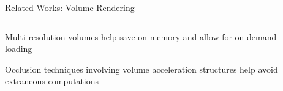 \documentclass[10pt,compress,professionalfont]{beamer}
\begin{document}
\begin{frame}{Related Works: Volume Rendering}

    \begin{columns}
        \begin{column}{0.7\textwidth}

    \vspace{-5mm}
    Multi-resolution volumes help save on memory and allow for on-demand loading\\
    \vspace{8mm}

    Occlusion techniques involving volume acceleration structures help avoid extraneous computations

        \end{column}
        \begin{column}{0.3\textwidth}
            \vspace{-4mm}

\end{column}
\end{columns}
\end{frame}
\end{document}
